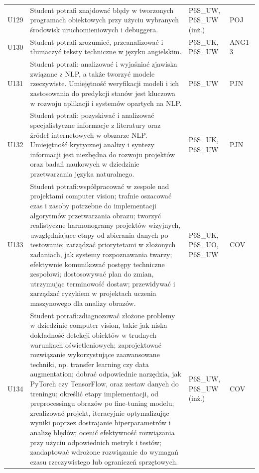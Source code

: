 \documentclass[12pt,a4paper]{article}
\begin{document}
{\begin{longtable}{m{1cm}m{8.8cm}m{2.1cm}m{2.5cm}}
\rowcolor{tableRowLight} U129 & Student potrafi znajdować błędy w tworzonych programach obiektowych przy użyciu wybranych środowisk uruchomieniowych i debuggera. & {\scriptsize P6S\_UW, P6S\_UW {\scriptsize (inż.)}} & {\scriptsize POJ} \\
\rowcolor{tableRowAlt} U130 & Student potrafi zrozumieć, przeanalizować i tłumaczyć teksty techniczne w języku angielskim. & {\scriptsize P6S\_UK, P6S\_UW} & {\scriptsize ANG1-3} \\
\rowcolor{tableRowLight} U131 & Student potrafi: analizować i wyjaśniać zjawiska związane z NLP, a także tworzyć modele rzeczywiste. Umiejętność weryfikacji modeli i ich zastosowania do predykcji stanów jest kluczowa w rozwoju aplikacji i systemów opartych na NLP. & {\scriptsize P6S\_UW} & {\scriptsize PJN} \\
\rowcolor{tableRowAlt} U132 & Student potrafi: pozyskiwać i analizować specjalistyczne informacje z literatury oraz źródeł internetowych w obszarze NLP. Umiejętność krytycznej analizy i syntezy informacji jest niezbędna do rozwoju projektów oraz badań naukowych w dziedzinie przetwarzania języka naturalnego. & {\scriptsize P6S\_UK, P6S\_UW} & {\scriptsize PJN} \\
\rowcolor{tableRowLight} U133 & Student potrafi:współpracować w zespole nad projektami computer vision; trafnie oszacować czas i zasoby potrzebne do implementacji algorytmów przetwarzania obrazu; tworzyć realistyczne harmonogramy projektów wizyjnych, uwzględniające etapy od zbierania danych po testowanie; zarządzać priorytetami w złożonych zadaniach, jak systemy rozpoznawania twarzy; efektywnie komunikować postępy techniczne zespołowi; dostosowywać plan do zmian, utrzymując terminowość dostaw; przewidywać i zarządzać ryzykiem w projektach uczenia maszynowego dla analizy obrazów. & {\scriptsize P6S\_UK, P6S\_UO, P6S\_UW} & {\scriptsize COV} \\
\rowcolor{tableRowAlt} U134 & Student potrafi:zdiagnozować złożone problemy w dziedzinie computer vision, takie jak niska dokładność detekcji obiektów w trudnych warunkach oświetleniowych; zaprojektować rozwiązanie wykorzystujące zaawansowane techniki, np. transfer learning czy data augmentation; dobrać odpowiednie narzędzia, jak PyTorch czy TensorFlow, oraz zestaw danych do treningu; określić etapy implementacji, od preprocessingu obrazów po fine-tuning modelu; zrealizować projekt, iteracyjnie optymalizując wyniki poprzez dostrajanie hiperparametrów i analizę błędów; ocenić efektywność rozwiązania przy użyciu odpowiednich metryk i testów; zaadaptować wdrożone rozwiązanie do wymagań czasu rzeczywistego lub ograniczeń sprzętowych. & {\scriptsize P6S\_UW, P6S\_UW {\scriptsize (inż.)}} & {\scriptsize COV} \\

\end{longtable}}
\end{document}
